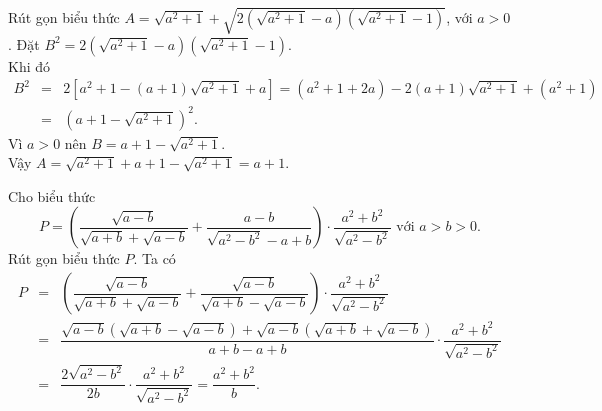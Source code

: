 \begin{bt}
	Rút gọn biểu thức $A=\sqrt{a^2+1}+\sqrt{2\left(\sqrt{a^2+1}-a\right)\left(\sqrt{a^2+1}-1\right)}$, với $a>0$.
	\loigiai
	{
		Đặt $B^2=2\left(\sqrt{a^2+1}-a\right)\left(\sqrt{a^2+1}-1\right)$.\\
		Khi đó
		\allowdisplaybreaks
		\begin{eqnarray*}
			B^2 &=& 2\left[a^2+1-(a+1)\sqrt{a^2+1}+a\right]=(a^2+1+2a)-2(a+1)\sqrt{a^2+1}+(a^2+1)\\
			&=& \left(a+1-\sqrt{a^{2}+1}\right)^2.
		\end{eqnarray*}
		Vì $a>0$ nên $B=a+1-\sqrt{a^{2}+1}$.\\
		Vậy $A=\sqrt{a^2+1}+a+1-\sqrt{a^2+1}=a+1$.
	}
\end{bt}

\begin{bt}%
	Cho biểu thức $$P=\left( \dfrac{\sqrt{a-b}}{\sqrt{a+b}+\sqrt{a-b}}+\dfrac{a-b}{\sqrt{a^2-b^2}-a+b}\right) \cdot\dfrac{a^2+b^2}{\sqrt{a^2-b^2}} \text{ với } a>b>0.$$
	Rút gọn biểu thức $P$.
	\loigiai
	{
		Ta có
		\allowdisplaybreaks
		\begin{eqnarray*}
			P &=& \left( \dfrac{\sqrt{a-b}}{\sqrt{a+b}+\sqrt{a-b}}+\dfrac{\sqrt{a-b}}{\sqrt{a+b}-\sqrt{a-b}}\right) \cdot\dfrac{a^2+b^2}{\sqrt{a^2-b^2}}\\
			&=& \dfrac{\sqrt{a-b}\left( \sqrt{a+b}-\sqrt{a-b}\right) +\sqrt{a-b}\left( \sqrt{a+b}+\sqrt{a-b}\right) }{a+b-a+b}\cdot\dfrac{a^2+b^2}{\sqrt{a^2-b^2}}\\
			&=& \dfrac{2\sqrt{a^2-b^2}}{2b}\cdot\dfrac{a^2+b^2}{\sqrt{a^2-b^2}}
			= \dfrac{a^2+b^2}{b}.
		\end{eqnarray*}
	}
\end{bt}

